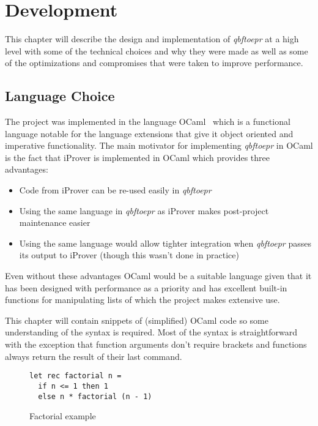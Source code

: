 \chapter{Development}
This chapter will describe the design and implementation of \textit{qbftoepr} at a high level with some of the technical choices and why they were made as well as some of the optimizations and compromises that were taken to improve performance.

\section{Language Choice}
The project was implemented in the language OCaml~\cite{ocaml} which is a functional language notable for the language extensions that give it object oriented and imperative functionality. The main motivator for implementing \textit{qbftoepr} in OCaml is the fact that iProver is implemented in OCaml which provides three advantages:

\begin{itemize}
\item Code from iProver can be re-used easily in \textit{qbftoepr}\\
\item Using the same language in \textit{qbftoepr} as iProver makes post-project maintenance easier\\
\item Using the same language would allow tighter integration when \textit{qbftoepr} passes its output to iProver (though this wasn't done in practice)\\
\end{itemize}

Even without these advantages OCaml would be a suitable language given that it has been designed with performance as a priority and has excellent built-in functions for manipulating lists of which the project makes extensive use.

This chapter will contain snippets of (simplified) OCaml code so some understanding of the syntax is required. Most of the syntax is straightforward with the exception that function arguments don't require brackets and functions always return the result of their last command.

\begin{figure}
\caption{Factorial example}
\begin{CenteredBox}
\begin{lstlisting}[language=caml, label=ocamlex]
let rec factorial n =
  if n <= 1 then 1
  else n * factorial (n - 1)
\end{lstlisting}
\end{CenteredBox}
\end{figure}

